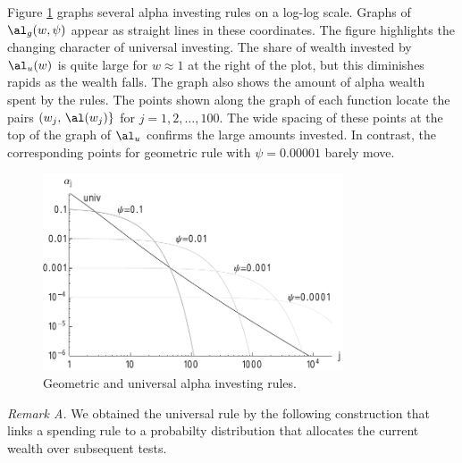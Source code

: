 \documentclass[12pt]{article}
\begin{document}
 Figure \ref{fig:rules} graphs several alpha investing rules on a log-log scale.
  Graphs of $\al_g(w,\psi)$ appear as straight lines in these coordinates.  The
 figure highlights the changing character of universal investing.  The share of
 wealth invested by $\al_u(w)$ is quite large for $w \approx 1$ at the right of
 the plot, but this diminishes rapids as the wealth falls.  The graph also shows
 the amount of alpha wealth spent by the rules.  The points shown along the
 graph of each function locate the pairs $(w_j, \,\al(w_j)\}$ for $j = 1,2,
 \ldots,100$.  The wide spacing of these points at the top of the graph of
 $\al_u$ confirms the large amounts invested.  In contrast, the corresponding
 points for geometric rule with $\psi= 0.00001$ barely move.


 \begin{figure}
 \caption{ \label{fig:rules} Geometric and universal alpha investing rules. }
 \centerline{    \includegraphics[width=3.5in]{figures/rules}  }
 \end{figure}



 \vspace*{0.2in}
 \noindent
 {\it Remark A. }  We obtained the universal rule by the following construction
 that links a spending rule to a probabilty distribution that allocates the
 current wealth over subsequent tests.   
\end{document}
